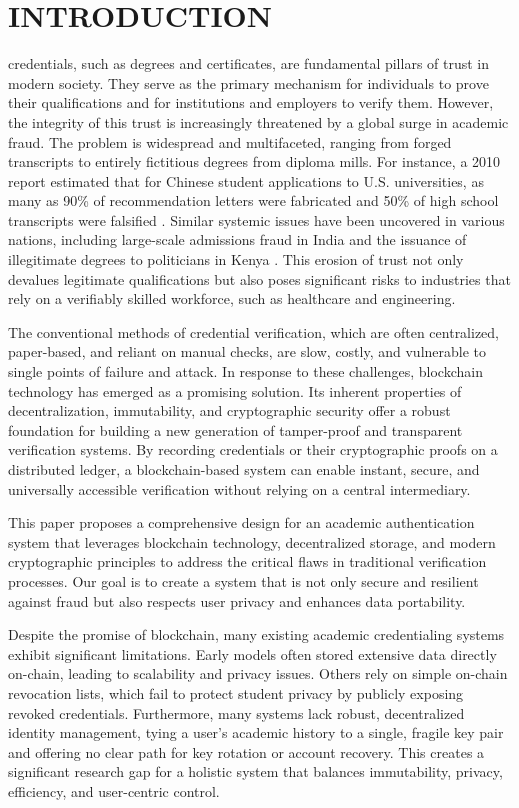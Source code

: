 \documentclass[lettersize,journal]{IEEEtran}
\begin{document}
\section{INTRODUCTION}
 credentials, such as degrees and certificates, are fundamental pillars of trust in modern society. They serve as the primary mechanism for individuals to prove their qualifications and for institutions and employers to verify them. However, the integrity of this trust is increasingly threatened by a global surge in academic fraud. The problem is widespread and multifaceted, ranging from forged transcripts to entirely fictitious degrees from diploma mills. For instance, a 2010 report estimated that for Chinese student applications to U.S. universities, as many as 90\% of recommendation letters were fabricated and 50\% of high school transcripts were falsified \cite{WES2017Fraud}. Similar systemic issues have been uncovered in various nations, including large-scale admissions fraud in India and the issuance of illegitimate degrees to politicians in Kenya \cite{WES2017Fraud}. This erosion of trust not only devalues legitimate qualifications but also poses significant risks to industries that rely on a verifiably skilled workforce, such as healthcare and engineering.

The conventional methods of credential verification, which are often centralized, paper-based, and reliant on manual checks, are slow, costly, and vulnerable to single points of failure and attack. In response to these challenges, blockchain technology has emerged as a promising solution. Its inherent properties of decentralization, immutability, and cryptographic security offer a robust foundation for building a new generation of tamper-proof and transparent verification systems. By recording credentials or their cryptographic proofs on a distributed ledger, a blockchain-based system can enable instant, secure, and universally accessible verification without relying on a central intermediary.

This paper proposes a comprehensive design for an academic authentication system that leverages blockchain technology, decentralized storage, and modern cryptographic principles to address the critical flaws in traditional verification processes. Our goal is to create a system that is not only secure and resilient against fraud but also respects user privacy and enhances data portability.

Despite the promise of blockchain, many existing academic credentialing systems exhibit significant limitations. Early models often stored extensive data directly on-chain, leading to scalability and privacy issues. Others rely on simple on-chain revocation lists, which fail to protect student privacy by publicly exposing revoked credentials. Furthermore, many systems lack robust, decentralized identity management, tying a user's academic history to a single, fragile key pair and offering no clear path for key rotation or account recovery. This creates a significant research gap for a holistic system that balances immutability, privacy, efficiency, and user-centric control.
\end{document}

